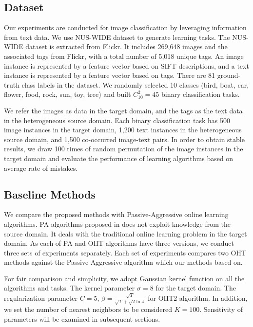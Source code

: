 \documentclass[letterpaper]{article}
\theoremstyle{remark}
\theoremstyle{definition}
\begin{document}
\subsection{Dataset}
Our experiments are conducted for image classification by leveraging information from text data.
We use NUS-WIDE dataset to generate learning tasks.
The NUS-WIDE dataset is extracted from Flickr.
It includes 269,648 images and the associated tags from Flickr, with a total number of 5,018 unique tags.
An image instance is represented by a feature vector based on SIFT descriptions, and a text instance is represented by a feature vector based on tags.
There are 81 ground-truth class labels in the dataset.
We randomly selected 10 classes (bird, boat, car, flower, food, rock, sun, toy, tree) and built $C_{10}^{2} = 45$ binary classification tasks.

We refer the images as data in the target domain, and the tags as the text data in the heterogeneous source domain.
Each binary classification task has 500 image instances in the target domain, 1,200 text instances in the heterogeneous source domain, and 1,500 co-occurred image-text pairs.
In order to obtain stable results, we draw 100 times of random permutation of the image instances in the target domain and evaluate the performance of learning algorithms based on average rate of mistakes.

\subsection{Baseline Methods}
We compare the proposed methods with Passive-Aggressive online learning algorithms.
PA algorithms proposed in \cite{crammer2006online} does not exploit knowledge from the source domain.
It deals with the traditional online learning problem in the target domain.
As each of PA and OHT algorithms have three versions, we conduct three sets of experiments separately.
Each set of experiments compares two OHT methods against the Passive-Aggressive algorithm which our methods based on.

For fair comparison and simplicity, we adopt Gaussian kernel function on all the algorithms and tasks.
The kernel parameter $\sigma = 8$ for the target domain.
The regularization parameter $C = 5$, $ \beta = \frac{\sqrt{T}}{\sqrt{T}+\sqrt{2\ln{4}}} $ for OHT2 algorithm.
In addition, we set the number of nearest neighbors to be considered $K = 100$.
Sensitivity of parameters will be examined in subsequent sections.
\end{document}
